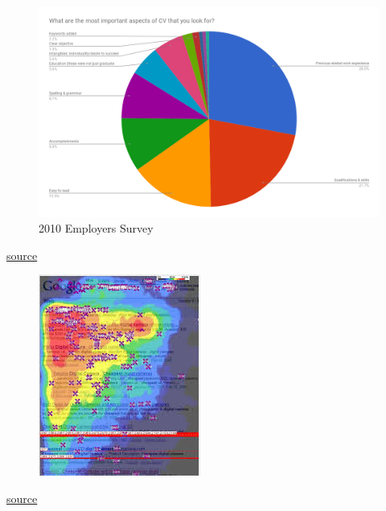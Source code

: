 \begin{frame}
	\begin{figure}
		\includegraphics[scale=.27]{assets/priority}
		\caption{2010 Employers Survey}
	\end{figure}
	\href{http://stevehanov.ca/blog/resume_comic.png}{source}
\end{frame}

\begin{frame}
	\begin{figure}
		\includegraphics[scale=.8]{assets/golden-triangle}
		
	\end{figure}
	\href{www.forbes.com/sites/roberthof/2015/03/03/how-do-you-google-new-eye-tracking-study-reveals-huge-changes/\#604c90423828}{source}
\end{frame}

